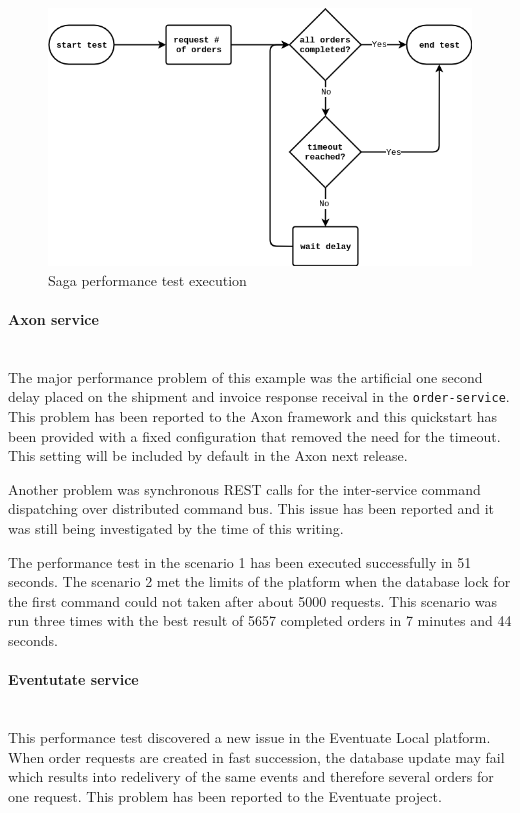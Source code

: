 \documentclass[oneside,
  digital, %
  table,   %
  lof,     %
  lot,     %
]{fithesis3}
\newcommand{\newlinepar}[1]{\paragraph{#1}\needspace{4\baselineskip}\mbox{}\\}
\begin{document}
\begin{figure}[h]
    \begin{center}
        \includegraphics[width=1.0\textwidth]{images/performance-test-flow.png}
    \end{center}
    \caption{Saga performance test execution}
\end{figure}


\newlinepar{Axon service}

The major performance problem of this example was the artificial one second delay placed on the shipment and invoice response receival in the \texttt{order-service}. This problem has been reported to the Axon framework and this quickstart has been provided with a fixed configuration that removed the need for the timeout. This setting will be included by default in the Axon next release. 

Another problem was synchronous REST calls for the inter-service command dispatching over distributed command bus. This issue has been reported and it was still being investigated by the time of this writing.

The performance test in the scenario 1 has been executed successfully in 51 seconds. The scenario 2 met the limits of the platform when the database lock for the first command could not taken after about 5000 requests. This scenario was run three times with the best result of 5657 completed orders in 7 minutes and 44 seconds.

\newlinepar{Eventutate service}

This performance test discovered a new issue in the Eventuate Local platform. When order requests are created in fast succession, the database update may fail which results into redelivery of the same events and therefore several orders for one request. This problem has been reported to the Eventuate project.
\end{document}

